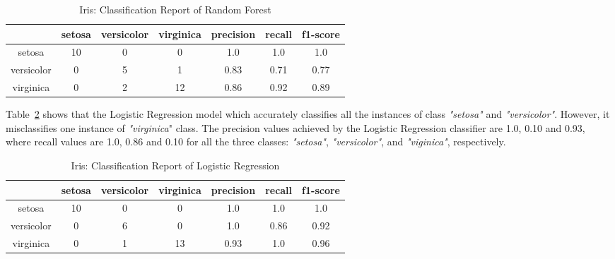 \documentclass[english]{tktltiki2}
\theoremstyle{definition}
\theoremstyle{remark}
\begin{document}
\begin{table}[H]
	\centering
	\caption{Iris: Classification Report of Random Forest}
	\label{table:rf_model_iris_report}
	\begin{tabular}{@{}ccccccc@{}}
		\toprule
		& setosa & versicolor & virginica & precision & recall & f1-score \\ \hline
		
		\multicolumn{1}{|c|}{setosa} & \multicolumn{1}{c|}{10} & \multicolumn{1}{c|}{0} & \multicolumn{1}{c|}{0} & \multicolumn{1}{c|}{1.0} & \multicolumn{1}{c|}{1.0} & \multicolumn{1}{c|}{1.0} \\ \hline
		
		\multicolumn{1}{|c|}{versicolor} & \multicolumn{1}{c|}{0} & \multicolumn{1}{c|}{5} & \multicolumn{1}{c|}{1} & \multicolumn{1}{c|}{0.83} & \multicolumn{1}{c|}{0.71} & \multicolumn{1}{c|}{0.77} \\ \hline
		
		\multicolumn{1}{|c|}{virginica} & \multicolumn{1}{c|}{0} & \multicolumn{1}{c|}{2} & \multicolumn{1}{c|}{12} & \multicolumn{1}{c|}{0.86} & \multicolumn{1}{c|}{0.92} & \multicolumn{1}{c|}{0.89} \\ \hline

	\end{tabular}
\end{table}

Table~\ref{table:lr_model_iris_report} shows that the Logistic Regression model which accurately classifies all the instances of class \textit{"setosa"} and \textit{"versicolor"}. However, it misclassifies one instance of \textit{"virginica}" class. The precision values achieved by the Logistic Regression classifier are 1.0, 0.10 and 0.93, where recall values are 1.0, 0.86 and 0.10 for all the three classes: \textit{"setosa"}, \textit{"versicolor"}, and \textit{"viginica"}, respectively.

\begin{table}[H]
	\centering
	\caption{Iris: Classification Report of Logistic Regression}
	\label{table:lr_model_iris_report}
	\begin{tabular}{@{}ccccccc@{}}
		\toprule
		& setosa & versicolor & virginica & precision & recall & f1-score \\ \hline
		
		\multicolumn{1}{|c|}{setosa} & \multicolumn{1}{c|}{10} & \multicolumn{1}{c|}{0} & \multicolumn{1}{c|}{0} & \multicolumn{1}{c|}{1.0} & \multicolumn{1}{c|}{1.0} & \multicolumn{1}{c|}{1.0} \\ \hline
		
		\multicolumn{1}{|c|}{versicolor} & \multicolumn{1}{c|}{0} & \multicolumn{1}{c|}{6} & \multicolumn{1}{c|}{0} & \multicolumn{1}{c|}{1.0} & \multicolumn{1}{c|}{0.86} & \multicolumn{1}{c|}{0.92} \\ \hline
		
		\multicolumn{1}{|c|}{virginica} & \multicolumn{1}{c|}{0} & \multicolumn{1}{c|}{1} & \multicolumn{1}{c|}{13} & \multicolumn{1}{c|}{0.93} & \multicolumn{1}{c|}{1.0} & \multicolumn{1}{c|}{0.96} \\ \hline
	\end{tabular}
\end{table}
\end{document}
